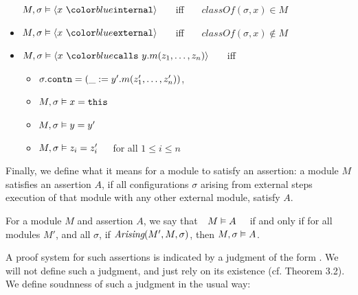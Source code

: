 \begin{definition}
\begin{itemize}
$\satisfiesA{M}{\sigma}{\internal{x}}$ \ \ \ iff \ \ \  
$\textit{classOf}(\sigma,x) \in M$
\item
$\satisfiesA{M}{\sigma}{\external{x}}$ \ \ \ iff \ \ \  
$\textit{classOf}(\sigma,x) \not\in M$
\item
$\satisfiesA{M}{\sigma}{\calls{x}{y}{m}{z_1, \ldots, z_n}}$ \ \ \ iff \ \ \ 
\begin{itemize}
\item
$\sigma.{\texttt{contn}} = (\_ := y'.m(z'_1,\ldots,z'_n))$, %
\item
$M , \sigma \vDash x = {\texttt{this}}$
\item
$M , \sigma \vDash y = y'$
\item
$M , \sigma \vDash z_i = z'_i$\ \ \ for all $1\!\leq i\!\leq n$
\end{itemize}
\end{itemize}
\end{definition}

 
Finally, we define what it means for a module to satisfy an assertion:
a module $M$ satisfies an assertion $A$, if all configurations $\sigma$
arising from external steps execution of that
module with any other external module, satisfy $A$. 
 
\begin{definition} 
\label{def:mdl-sat}
For a module $M$ and assertion $A$, we say that\ \  $M \vDash A$ \ \ if and only if 
for all modules $M'$, and all $\sigma$, if $\textit{Arising}(M', M, \sigma)$, then $M , \sigma \vDash A$.
\end{definition}



A proof system for such assertions is indicated by a judgment of the form . 
We will not define such a judgment, and just rely on its existence (cf. Theorem 3.2).
We define soudnness of such a judgment in the usual way:

